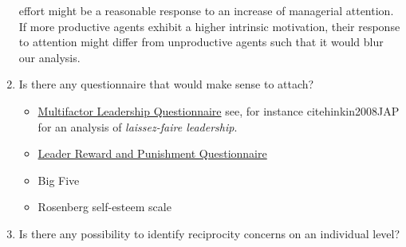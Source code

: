 \begin{enumerate}
      effort might be a reasonable response to an increase of managerial attention. If more productive agents
      exhibit a higher intrinsic motivation, their response to attention might differ from unproductive
      agents such that it would blur our analysis.
      \item Is there any questionnaire that would make sense to attach?
      	\begin{itemize}
			\item \href{http://www.mindgarden.com/documents/MLQGermanPsychometric.pdf}{Multifactor Leadership
			Questionnaire} see, for instance cite{hinkin2008JAP} for an analysis of \textit{laissez-faire
			leadership}.
			\item \href {http://www.sciencedirect.com/science/article/pii/S0749597805001184}{Leader Reward
			and Punishment Questionnaire}
			\item Big Five
			\item Rosenberg self-esteem scale
		\end{itemize}
	\item Is there any possibility to identify reciprocity concerns on an individual level?
      
      
\end{enumerate}



